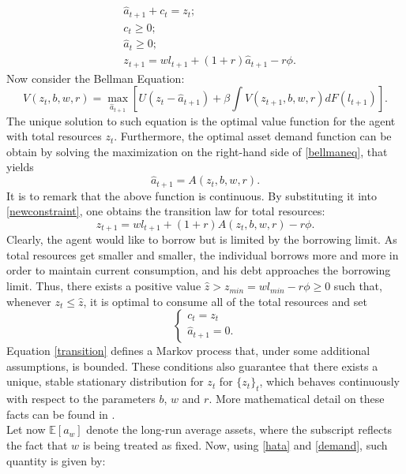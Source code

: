 \documentclass[12pt]{article}
\begin{document}
\begin{align}
\label{newconstraint}
&\hat{a}_{t+1} + c_t = z_t;  \\
&c_t \geq 0; \nonumber \\
&\hat{a}_t \geq 0; \nonumber \\
&z_{t+1} = wl_{t+1} + (1 + r)\hat{a}_{t+1} - r\phi.
\end{align}
Now consider the Bellman Equation:
\begin{equation}
\label{bellmaneq}
V\left(z_t, b, w, r \right) = \max_{\hat{a}_{t+1}}\left[U\left(z_t - \hat{a}_{t+1}\right) + \beta \int V(z_{t+1},b, w,r)dF(l_{t+1}) \right].
\end{equation}
The unique solution to such equation is the optimal value function for the agent with total resources $z_t$. Furthermore, the optimal asset demand function can be obtain by solving the maximization on the right-hand side of \ref{bellmaneq}, that yields
\begin{equation}
\label{demand}
\hat{a}_{t+1} = A(z_t, b, w, r).
\end{equation}
It is to remark that the above function is continuous. By substituting it into \ref{newconstraint}, one obtains the transition law for total resources:
\begin{equation}
\label{transition}
z_{t+1} = wl_{t+1} + (1+r)A(z_t, b, w, r) - r\phi.
\end{equation}
Clearly, the agent would like to borrow but is limited by the borrowing limit. As total resources get smaller and smaller, the individual borrows more and more in order to maintain current consumption, and his debt approaches the borrowing limit. Thus, there exists a positive value $\hat{z}>z_{min}=wl_{min} - r\phi \geq 0$ such that, whenever $z_t \leq \hat{z}$, it is optimal to consume all of the total resources and set
\begin{equation*}
\begin{cases}
c_t = z_t \\
\hat{a}_{t+1} = 0.
\end{cases}
\end{equation*}
Equation \ref{transition} defines a Markov process that, under some additional assumptions, is bounded. These conditions also guarantee that there exists a unique, stable stationary distribution for $z_t$ for $\{z_t\}_t$, which behaves continuously with respect to the parameters $b$, $w$ and $r$. More mathematical detail on these facts can be found in \cite{aiya93}. \\
Let now $\mathbb E\left[ a_w \right]$ denote the long-run average assets, where the subscript reflects the fact that $w$ is being treated as fixed. Now, using \ref{hata} and \ref{demand}, such quantity is given by:
\end{document}
